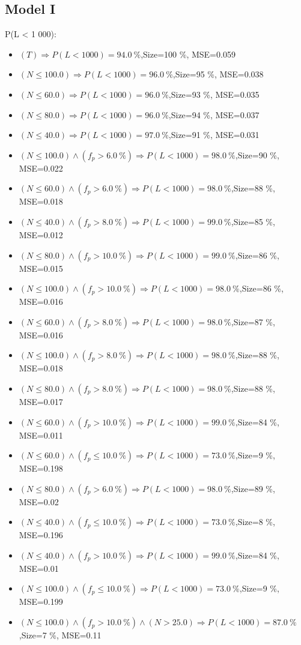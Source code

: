 \documentclass[numbered]{CSL}
\begin{document}
\subsection{Model I}
P(L < 1 000):
\begin{itemize}
\item $(T) \Rightarrow P(L < 1 000) = 94.0~\%$,\hfill Size=100 \%, MSE=0.059
\item $(N \leq 100.0) \Rightarrow P(L < 1 000) = 96.0~\%$,\hfill Size=95 \%, MSE=0.038
\item $(N \leq 60.0) \Rightarrow P(L < 1 000) = 96.0~\%$,\hfill Size=93 \%, MSE=0.035
\item $(N \leq 80.0) \Rightarrow P(L < 1 000) = 96.0~\%$,\hfill Size=94 \%, MSE=0.037
\item $(N \leq 40.0) \Rightarrow P(L < 1 000) = 97.0~\%$,\hfill Size=91 \%, MSE=0.031
\item $(N \leq 100.0) \land (f_p > 6.0~\%) \Rightarrow P(L < 1 000) = 98.0~\%$,\hfill Size=90 \%, MSE=0.022
\item $(N \leq 60.0) \land (f_p > 6.0~\%) \Rightarrow P(L < 1 000) = 98.0~\%$,\hfill Size=88 \%, MSE=0.018
\item $(N \leq 40.0) \land (f_p > 8.0~\%) \Rightarrow P(L < 1 000) = 99.0~\%$,\hfill Size=85 \%, MSE=0.012
\item $(N \leq 80.0) \land (f_p > 10.0~\%) \Rightarrow P(L < 1 000) = 99.0~\%$,\hfill Size=86 \%, MSE=0.015
\item $(N \leq 100.0) \land (f_p > 10.0~\%) \Rightarrow P(L < 1 000) = 98.0~\%$,\hfill Size=86 \%, MSE=0.016
\item $(N \leq 60.0) \land (f_p > 8.0~\%) \Rightarrow P(L < 1 000) = 98.0~\%$,\hfill Size=87 \%, MSE=0.016
\item $(N \leq 100.0) \land (f_p > 8.0~\%) \Rightarrow P(L < 1 000) = 98.0~\%$,\hfill Size=88 \%, MSE=0.018
\item $(N \leq 80.0) \land (f_p > 8.0~\%) \Rightarrow P(L < 1 000) = 98.0~\%$,\hfill Size=88 \%, MSE=0.017
\item $(N \leq 60.0) \land (f_p > 10.0~\%) \Rightarrow P(L < 1 000) = 99.0~\%$,\hfill Size=84 \%, MSE=0.011
\item $(N \leq 60.0) \land (f_p \leq 10.0~\%) \Rightarrow P(L < 1 000) = 73.0~\%$,\hfill Size=9 \%, MSE=0.198
\item $(N \leq 80.0) \land (f_p > 6.0~\%) \Rightarrow P(L < 1 000) = 98.0~\%$,\hfill Size=89 \%, MSE=0.02
\item $(N \leq 40.0) \land (f_p \leq 10.0~\%) \Rightarrow P(L < 1 000) = 73.0~\%$,\hfill Size=8 \%, MSE=0.196
\item $(N \leq 40.0) \land (f_p > 10.0~\%) \Rightarrow P(L < 1 000) = 99.0~\%$,\hfill Size=84 \%, MSE=0.01
\item $(N \leq 100.0) \land (f_p \leq 10.0~\%) \Rightarrow P(L < 1 000) = 73.0~\%$,\hfill Size=9 \%, MSE=0.199
\item $(N \leq 100.0) \land (f_p > 10.0~\%) \land (N > 25.0) \Rightarrow P(L < 1 000) = 87.0~\%$,\hfill Size=7 \%, MSE=0.11
\end{itemize}
\end{document}
